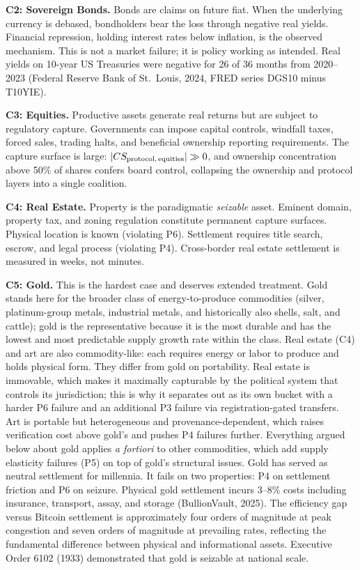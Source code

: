 \documentclass[12pt]{article}
\theoremstyle{definition}
\theoremstyle{remark}
\begin{document}
\noindent\textbf{C2: Sovereign Bonds.} Bonds are claims on future fiat. When the
underlying currency is debased, bondholders bear the loss through
negative real yields. Financial repression, holding interest rates below
inflation, is the observed mechanism. This is not a market failure; it
is policy working as intended. Real yields on 10-year US Treasuries
were negative for 26 of 36 months from 2020--2023 (Federal Reserve Bank
of St.~Louis, 2024, FRED series DGS10 minus T10YIE).

\noindent\textbf{C3: Equities.} Productive assets generate real returns but are
subject to regulatory capture. Governments can impose capital controls,
windfall taxes, forced sales, trading halts, and beneficial ownership
reporting requirements. The capture surface is large:
$|CS_\text{protocol,\,equities}| \gg 0$, and ownership concentration
above 50\% of shares confers board control, collapsing the ownership
and protocol layers into a single coalition.

\noindent\textbf{C4: Real Estate.} Property is the paradigmatic \emph{seizable}
asset. Eminent domain, property tax, and zoning regulation constitute
permanent capture surfaces. Physical location is known (violating P6).
Settlement requires title search, escrow, and legal process (violating
P4). Cross-border real estate settlement is measured in weeks, not
minutes.

\noindent\textbf{C5: Gold.} This is the hardest case and deserves extended
treatment. Gold stands here for the broader class of energy-to-produce
commodities (silver, platinum-group metals, industrial metals, and
historically also shells, salt, and cattle); gold is the representative
because it is the most durable and has the lowest and most predictable
supply growth rate within the class. Real estate (C4) and art are also commodity-like: each requires energy
or labor to produce and holds physical form. They differ from gold on
portability. Real estate is immovable, which makes it maximally
capturable by the political system that controls its jurisdiction;
this is why it separates out as its own bucket with a harder P6 failure
and an additional P3 failure via registration-gated transfers. Art is
portable but heterogeneous and provenance-dependent, which raises
verification cost above gold's and pushes P4 failures further.
Everything argued below about gold applies \emph{a fortiori} to other
commodities, which add supply elasticity failures (P5) on top of gold's
structural issues. Gold has served as neutral settlement for millennia.
It fails on two properties: P4 on settlement friction and P6 on
seizure. Physical gold settlement incurs 3--8\% costs including
insurance, transport, assay, and storage (BullionVault, 2025). The
efficiency gap versus Bitcoin settlement is approximately four orders
of magnitude at peak congestion and seven orders of magnitude at
prevailing rates, reflecting the fundamental difference between
physical and informational assets. Executive Order 6102 (1933)
demonstrated that gold is seizable at national scale.
\end{document}
